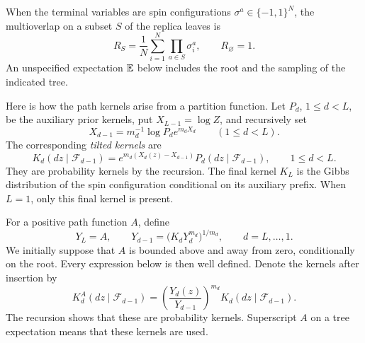 When the terminal variables are spin configurations
$\sigma^a\in\{-1,1\}^N$, the multioverlap on a subset $S$ of the
replica leaves is
\begin{equation}\label{tree:multioverlap}
 R_S=\frac1N\sum_{i=1}^N\prod_{a\in S}\sigma_i^a,
 \qquad R_\varnothing=1.
\end{equation}
An unspecified expectation $\mathbb E$ below includes the root and the
sampling of the indicated tree.

Here is how the path kernels arise from a partition function. Let
$P_d$, $1\le d<L$, be the auxiliary prior kernels, put
$X_{L-1}=\log Z$, and recursively set
\[
 X_{d-1}=m_d^{-1}\log P_d e^{m_dX_d}\qquad(1\le d<L).
\]
The corresponding \emph{tilted kernels} are
\begin{equation}\label{tree:original-tilt}
 K_d(dz\mid\mathscr F_{d-1})
 =e^{m_d(X_d(z)-X_{d-1})}P_d(dz\mid\mathscr F_{d-1}),
 \qquad 1\le d<L.
\end{equation}
They are probability kernels by the recursion. The final kernel $K_L$
is the Gibbs distribution of the spin configuration conditional on its
auxiliary prefix. When $L=1$, only this final kernel is present.

For a positive path function $A$, define
\begin{equation}\label{tree:Y-recursion}
  Y_L=A,\qquad
  Y_{d-1}=\bigl(K_dY_d^{m_d}\bigr)^{1/m_d},
  \qquad d=L,\ldots,1.
\end{equation}
We initially suppose that $A$ is bounded above and away from zero,
conditionally on the root.  Every expression below is then well
defined.  Denote the kernels after insertion by
\begin{equation}\label{tree:updated-kernel}
  K_d^A(dz\mid\mathscr F_{d-1})
  =\left(\frac{Y_d(z)}{Y_{d-1}}\right)^{m_d}
     K_d(dz\mid\mathscr F_{d-1}).
\end{equation}
The recursion shows that these are probability kernels.  Superscript
$A$ on a tree expectation means that these kernels are used.

